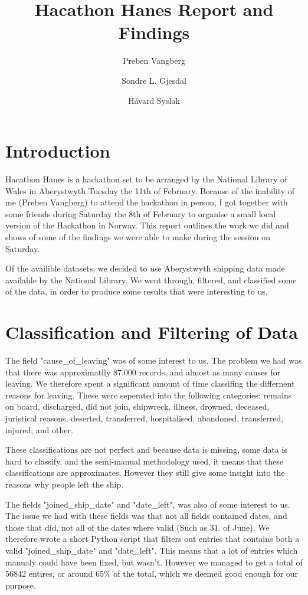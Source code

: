 \documentclass{article}
\author[1,3]{Preben Vangberg}
\author[2]{Sondre L. Gjesdal}
\author[3]{Håvard Syslak}
\affil[1]{Department of Computer Science, Aberystwyth University, Wales}
\affil[2]{Western Norway University of Applied Sciences, Norway}
\affil[3]{MMP PM MON MAIN AUT, Equinor ASA, Norway}
\title{Hacathon Hanes Report and Findings}
\begin{document}
\maketitle
\newpage

\section{Introduction}

Hacathon Hanes is a hackathon set to be arranged by the National Library of Wales in Aberystwyth Tuesday the 11th of February.
Because of the inability of me (Preben Vangberg) to attend the hackathon in person, I got together with some friends during Saturday the 8th of February to organise a small local version of the Hackathon in Norway.
This report outlines the work we did and shows of some of the findings we were able to make during the session on Saturday.

Of the availible datasets, we decided to use Aberystwyth shipping data made available by the National Library.
We went through, filtered, and classified some of the data, in order to produce some results that were interesting to us.

\section{Classification and Filtering of Data}

The field "cause\_of\_leaving" was of some interest to us. The problem we had was that there was approximatlly 87.000 records, and almost as many causes for leaving. 
We therefore spent a significant amount of time classifing the differnent reasons for leaving.
These were seperated into the following categories: remains on board, discharged, did not join, shipwreck, illness, drowned, deceased, juristical reasons, deserted, transferred, hospitalised, abandoned, transferred, injured, and other. 

These classifications are not perfect and because data is missing, some data is hard to classify, and the semi-manual methodology used, it means that these classifications are approximates. However they still give some insight into the reasons why people left the ship.

The fields "joined\_ship\_date" and "date\_left", was also of some interest to us.
The issue we had with these fields was that not all fields contained dates, and those that did, not all of the dates where valid (Such as 31. of June).
We therefore wrote a short Python script that filters out entries that contains both a valid "joined\_ship\_date" and "date\_left". This means that a lot of entries which manualy could have been fixed, but wasn't. However we managed to get a total of 56842 entires, or around 65\% of the total, which we deemed good enough for our purpose.
\end{document}
